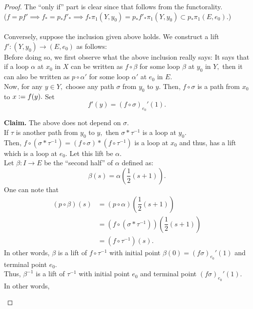 \documentclass[12pt]{article}
\theoremstyle{definition}
\numberwithin{thm}{section}
\newenvironment{blockquote}
{\begin{mdframed}[skipabove=0pt, skipbelow=0pt, innertopmargin=4pt, innerbottommargin=4pt, bottomline=false,topline=false,rightline=false, linewidth=2pt]}
{\end{mdframed}}
\begin{document}
\begin{proof} 
	The ``only if'' part is clear since that follows from the functorality. \\
	($f = pf' \implies f_* = p_*f'_* \implies f_*\pi_1(Y, y_0) = p_*f'_*\pi_1(Y, y_0) \subset p_*\pi_1(E, e_0).$)\\~\\
	Conversely, suppose the inclusion given above holds. We construct a lift $f':(Y, y_0) \to (E, e_0)$ as follows:\\
	Before doing so, we first observe what the above inclusion really says: It says that if a loop $\alpha$ at $x_0$ in $X$ can be written as $f\circ\beta$ for some loop $\beta$ at $y_0$ in $Y,$ then it can also be written as $p\circ\alpha'$ for some loop $\alpha'$ at $e_0$ in $E.$\\
	Now, for any $y \in Y,$ choose any path $\sigma$ from $y_0$ to $y.$ Then, $f\circ\sigma$ is a path from $x_0$ to $x \vcentcolon= f(y).$ Set
	\begin{equation*} 
		f'(y) = (f\circ\sigma)_{e_0}'(1).
	\end{equation*}
	\begin{blockquote}
		\textbf{Claim.} The above does not depend on $\sigma.$\\
		If $\tau$ is another path from $y_0$ to $y,$ then $\sigma*\tau^{-1}$ is a loop at $y_0.$\\
		Then, $f\circ(\sigma*\tau^{-1}) = (f\circ\sigma)*(f\circ\tau^{-1})$ is a loop at $x_0$ and thus, has a lift which is a loop at $e_0.$ Let this lift be $\alpha.$ \\
		Let $\beta:I\to E$ be the ``second half'' of $\alpha$ defined as:
		\begin{equation*} 
			\beta(s) = \alpha\left(\dfrac{1}{2}(s + 1)\right).
		\end{equation*}
		One can note that
		\begin{align*} 
			(p\circ\beta)(s) &= (p\circ\alpha)\left(\dfrac{1}{2}(s + 1)\right)\\
			&= (f\circ(\sigma*\tau^{-1}))\left(\dfrac{1}{2}(s + 1)\right)\\
			&= (f\circ\tau^{-1})(s).
		\end{align*}
		In other words, $\beta$ is a lift of $f\circ\tau^{-1}$ with initial point $\beta(0) = (f\sigma)_{e_0}'(1)$ and terminal point $e_0.$\\
		Thus, $\beta^{-1}$ is a lift of $\tau^{-1}$ with initial point $e_0$ and terminal point $(f\sigma)_{e_0}'(1).$ In other words,
		\begin{equation*} 

\end{equation*}
\end{blockquote}
\end{proof}
\end{document}
